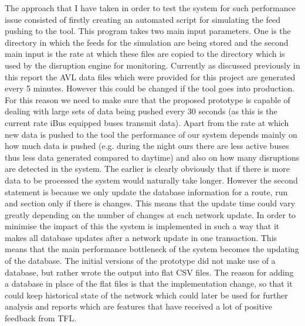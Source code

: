 The approach that I have taken in order to test the system for such performance issue consisted of firstly creating an automated script for simulating the feed pushing to the tool. This program takes two main input parameters. One is the directory in which the feeds for the simulation are being stored and the second main input is the rate at which these files are copied to the directory which is used by the disruption engine for monitoring. Currently as discussed previously in this report the AVL data files which were provided for this project are generated every 5 minutes. However this could be changed if the tool goes into production. For this reason we need to make sure that the proposed prototype is capable of dealing with large sets of data being pushed every 30 seconds (as this is the current rate iBus equipped buses transmit data). Apart from the rate at which new data is pushed to the tool the performance of our system depends mainly on how much data is pushed (e.g. during the night ours there are less active buses thus less data generated compared to daytime) and also on how many disruptions are detected in the system. The earlier is clearly obviously that if there is more data to be processed the system would naturally take longer. However the second statement is because we only update the database information for a route, run and section only if there is changes. This means that the update time could vary greatly depending on the number of changes at each network update. In order to minimise the impact of this the system is implemented in such a way that it makes all database updates after a network update in one transaction. This means that the main performance bottleneck of the system becomes the updating of the database. The initial versions of the prototype did not make use of a database, but rather wrote the output into flat CSV files. The reason for adding a database in place of the flat files is that the implementation change, so that it could keep historical state of the network which could later be used for further analysis and reports which are features that have received a lot of positive feedback from TFL.

